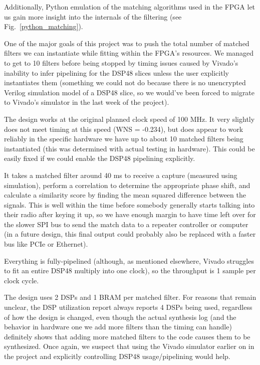 \documentclass[conference]{IEEEtran}
\begin{document}
Additionally, Python emulation of the matching algorithms used in the FPGA let us gain more insight into the internals of the filtering (see Fig.~\ref{python_matching}).

One of the major goals of this project was to push the total number of matched filters we can instantiate while fitting within the FPGA's resources. We managed to get to 10 filters before being stopped by timing issues caused by Vivado's inability to infer pipelining for the DSP48 slices unless the user explicitly instantiates them (something we could not do because there is no unencrypted Verilog simulation model of a DSP48 slice, so we would've been forced to migrate to Vivado's simulator in the last week of the project).

The design works at the original planned clock speed of 100 MHz. It very slightly does not meet timing at this speed (WNS = -0.234), but does appear to work reliably in the specific hardware we have up to about 10 matched filters being instantiated (this was determined with actual testing in hardware). This could be easily fixed if we could enable the DSP48 pipelining explicitly.

It takes a matched filter around 40 ms to receive a capture (measured using simulation), perform a correlation to determine the appropriate phase shift, and calculate a similarity score by finding the mean squared difference between the signals. This is well within the time before somebody generally starts talking into their radio after keying it up, so we have enough margin to have time left over for the slower SPI bus to send the match data to a repeater controller or computer (in a future design, this final output could probably also be replaced with a faster bus like PCIe or Ethernet).

Everything is fully-pipelined (although, as mentioned elsewhere, Vivado struggles to fit an entire DSP48 multiply into one clock), so the throughput is 1 sample per clock cycle.

The design uses 2 DSPs and 1 BRAM per matched filter. For reasons that remain unclear, the DSP utilization report always reports 4 DSPs being used, regardless of how the design is changed, even though the actual synthesis log (and the behavior in hardware one we add more filters than the timing can handle) definitely shows that adding more matched filters to the code causes them to be synthesized. Once again, we suspect that using the Vivado simulator earlier on in the project and explicitly controlling DSP48 usage/pipelining would help.
\end{document}
